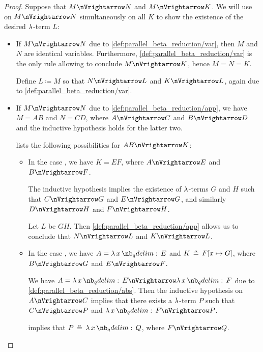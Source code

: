 \begin{proof}
  Suppose that \( M \pred N \) and \( M \pred K \). We will use  on \( M \pred N \) simultaneously on all \( K \) to show the existence of the desired \( \mathrm{\lambda} \)-term \( L \):
  \begin{itemize}
    \item If \( M \pred N \) due to \ref{def:parallel_beta_reduction/var}, then \( M \) and \( N \) are identical variables. Furthermore, \ref{def:parallel_beta_reduction/var} is the only rule allowing to conclude \( M \pred K \), hence \( M = N = K \).

    Define \( L \coloneqq M \) so that \( N \pred L \) and \( K \pred L \), again due to \ref{def:parallel_beta_reduction/var}.

    \item If \( M \pred N \) due to \ref{def:parallel_beta_reduction/app}, we have \( M = AB \) and \( N = CD \), where \( A \pred C \) and \( B \pred D \) and the inductive hypothesis holds for the latter two.

     lists the following possibilities for \( AB \pred K \):
    \begin{itemize}
      \item In the case , we have \( K = EF \), where \( A \pred E \) and \( B \pred F \).

      The inductive hypothesis implies the existence of \( \mathrm{\lambda} \)-terms \( G \) and \( H \) such that \( C \pred G \) and \( E \pred G \), and similarly \( D \pred H \) and \( F \pred H \).

      Let \( L \) be \( GH \). Then \ref{def:parallel_beta_reduction/app} allows us to conclude that \( N \pred L \) and \( K \pred L \).

      \item In the case , we have \( A = \qabs x E \) and \( K \aequiv F[x \mapsto G] \), where \( B \pred G \) and \( E \pred F \).

      We have \( A = \qabs x E \pred \qabs x F \) due to \ref{def:parallel_beta_reduction/abs}. Then the inductive hypothesis on \( A \pred C \) implies that there exists a \( \mathrm{\lambda} \)-term \( P \) such that \( C \pred P \) and \( \qabs x F \pred P \).

       implies that \( P \aequiv \qabs x Q \), where \( F \pred Q \).


\end{itemize}
\end{itemize}
\end{proof}
